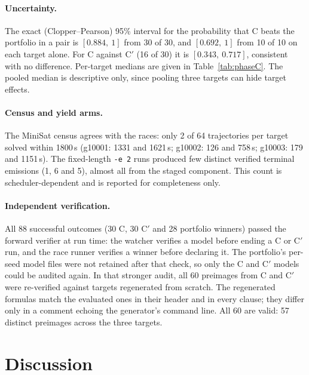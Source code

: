 \documentclass[11pt,a4paper]{article}
\newcommand{\flag}[1]{\texttt{#1}}
\begin{document}
\paragraph{Uncertainty.} The exact (Clopper--Pearson) 95\% interval for the probability that C beats
the portfolio in a pair is $[0.884,\ 1]$ from 30 of 30, and $[0.692,\ 1]$ from 10 of 10 on each
target alone. For C against C$'$ (16 of 30) it is $[0.343,\ 0.717]$, consistent with no
difference. Per-target medians are given in Table~\ref{tab:phaseC}. The pooled median is
descriptive only, since pooling three targets can hide target effects.

\paragraph{Census and yield arms.} The MiniSat census agrees with the races: only 2 of 64 trajectories
per target solved within 1800\,s (g10001: 1331 and 1621\,s; g10002: 126 and 758\,s; g10003: 179 and
1151\,s). The fixed-length \flag{-e 2} runs produced few distinct verified terminal emissions (1, 6
and 5), almost all from the staged component. This count is scheduler-dependent and is reported for
completeness only.

\paragraph{Independent verification.} All 88 successful outcomes (30 C, 30 C$'$ and 28 portfolio
winners) passed the forward verifier at run time: the watcher verifies a model before ending a C or C$'$
run, and the race runner verifies a winner before declaring it. The portfolio's per-seed model files
were not retained after that check, so only the C and C$'$ models could be audited again. In that
stronger audit, all 60 preimages from C and C$'$ were re-verified against
targets regenerated from scratch. The regenerated formulas match the evaluated ones in their header
and in every clause; they differ only in a comment echoing the generator's command line. All 60 are
valid: 57 distinct preimages across the three targets.

\section{Discussion}
\end{document}
